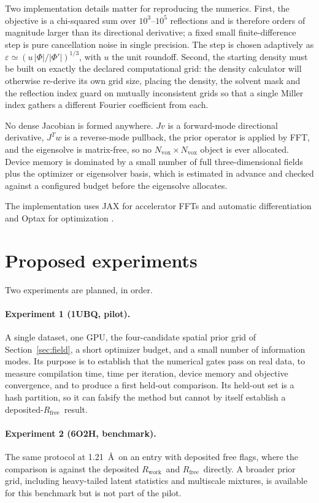 \documentclass[11pt]{article}
\newcommand{\Rwork}{\ensuremath{R_{\mathrm{work}}}}
\newcommand{\Rfree}{\ensuremath{R_{\mathrm{free}}}}
\begin{document}
Two implementation details matter for reproducing the numerics. First, the objective is a
chi-squared sum over $10^3$--$10^5$ reflections and is therefore orders of magnitude larger
than its directional derivative; a fixed small finite-difference step is pure cancellation
noise in single precision. The step is chosen adaptively as
$\varepsilon\simeq(u\,|\Phi|/|\Phi'|)^{1/3}$, with $u$ the unit roundoff. Second, the
starting density must be built on exactly the declared computational grid: the density
calculator will otherwise re-derive its own grid size, placing the density, the solvent mask
and the reflection index guard on mutually inconsistent grids so that a single Miller index
gathers a different Fourier coefficient from each.

No dense Jacobian is formed anywhere. $Jv$ is a forward-mode directional derivative, $J^Tw$
is a reverse-mode pullback, the prior operator is applied by FFT, and the eigensolve is
matrix-free, so no $N_{\mathrm{vox}}\times N_{\mathrm{vox}}$ object is ever allocated.
Device memory is dominated by a small number of full three-dimensional fields plus the
optimizer or eigensolver basis, which is estimated in advance and checked against a
configured budget before the eigensolve allocates.

The implementation uses JAX for accelerator FFTs and automatic differentiation and Optax for optimization \cite{jax2018,deepmind2020}.

\section{Proposed experiments}
\label{sec:experiments}
Two experiments are planned, in order.

\paragraph{Experiment 1 (1UBQ, pilot).} A single dataset, one GPU, the four-candidate
spatial prior grid of Section~\ref{sec:field}, a short optimizer budget, and a small number
of information modes. Its purpose is to establish that the numerical gates pass on real
data, to measure compilation time, time per iteration, device memory and objective
convergence, and to produce a first held-out comparison. Its held-out set is a hash
partition, so it can falsify the method but cannot by itself establish a deposited-\Rfree\
result.

\paragraph{Experiment 2 (6O2H, benchmark).} The same protocol at 1.21~\AA\ on an entry with
deposited free flags, where the comparison is against the deposited \Rwork\ and \Rfree\
directly. A broader prior grid, including heavy-tailed latent statistics and multiscale
mixtures, is available for this benchmark but is not part of the pilot.
\end{document}

